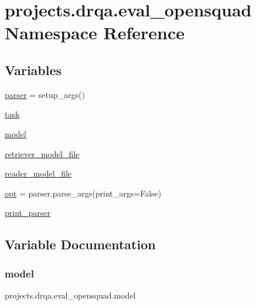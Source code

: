 \hypertarget{namespaceprojects_1_1drqa_1_1eval__opensquad}{}\section{projects.\+drqa.\+eval\+\_\+opensquad Namespace Reference}
\label{namespaceprojects_1_1drqa_1_1eval__opensquad}
\subsection*{Variables}
\begin{DoxyCompactItemize}
\item 
\hyperlink{namespaceprojects_1_1drqa_1_1eval__opensquad_aca05e49477b0c382916133871433dcdf}{parser} = setup\+\_\+args()
\item 
\hyperlink{namespaceprojects_1_1drqa_1_1eval__opensquad_af449860119ed94cd3e72b341d27dc900}{task}
\item 
\hyperlink{namespaceprojects_1_1drqa_1_1eval__opensquad_a1f553346a2a1464aa5251677cf4e4890}{model}
\item 
\hyperlink{namespaceprojects_1_1drqa_1_1eval__opensquad_a1bb69d1a341755d6eee47a7d4f841d3c}{retriever\+\_\+model\+\_\+file}
\item 
\hyperlink{namespaceprojects_1_1drqa_1_1eval__opensquad_a0901b0afbe82efd624b7a51f3fcb4b32}{reader\+\_\+model\+\_\+file}
\item 
\hyperlink{namespaceprojects_1_1drqa_1_1eval__opensquad_a25d6a556450d3ddc82c089e3dbcae835}{opt} = parser.\+parse\+\_\+args(print\+\_\+args=False)
\item 
\hyperlink{namespaceprojects_1_1drqa_1_1eval__opensquad_a2859df7a3e2c268e413e14a9c7181160}{print\+\_\+parser}
\end{DoxyCompactItemize}


\subsection{Variable Documentation}
\mbox{\label{namespaceprojects_1_1drqa_1_1eval__opensquad_a1f553346a2a1464aa5251677cf4e4890}} 
\subsubsection{\texorpdfstring{model}{model}}
{\footnotesize\ttfamily projects.\+drqa.\+eval\+\_\+opensquad.\+model}


